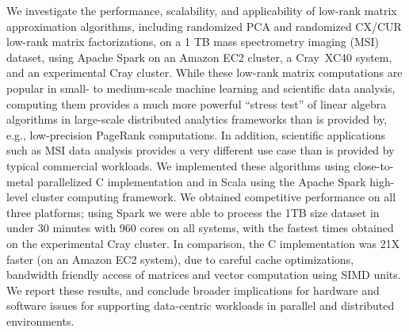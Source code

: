 We investigate the performance, scalability, and applicability of low-rank matrix approximation algorithms, including randomized PCA and randomized CX/CUR low-rank matrix factorizations, on a 1 TB mass spectrometry imaging (MSI) dataset, using Apache Spark on an Amazon EC2 cluster, a 
Cray~XC40 system, and an experimental Cray cluster.
While these low-rank matrix computations are popular in small- to medium-scale machine learning and scientific data analysis, computing them provides a much more powerful ``stress test'' of linear algebra algorithms in large-scale distributed analytics frameworks than is provided by, e.g., low-precision PageRank computations.
In addition, scientific applications such as MSI data analysis provides a very different use case 
than is provided by typical commercial workloads.
We implemented these algorithms using close-to-metal parallelized C 
implementation and in Scala using the Apache Spark high-level cluster computing framework.  
We obtained competitive performance on all three platforms; 
using Spark we were able to process the 1TB size dataset in under 30 minutes with 960 cores on all systems, with the fastest times obtained on the experimental Cray cluster.
In comparison, the C implementation was 21X faster (on an Amazon EC2 system), due to careful cache optimizations,
bandwidth friendly access of matrices and vector computation using SIMD units. 
We report these results, and conclude broader implications for hardware and software issues for supporting data-centric workloads in parallel and distributed environments.  
